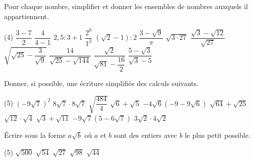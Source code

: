 \documentclass[a4paper,12pt]{report}
\begin{document}
\begin{exo}
Pour chaque nombre, simplifier et donner les ensembles de nombres auxquels il appartiennent.
\begin{tasks}(4)
\task $\dfrac{3-7}{2}$
\task $\dfrac{4}{4-1}$
\task $2,5: 3+1$
\task $\dfrac{2^0}{1^2}$
\task $(\sqrt{2}-1): 2$
\task $\dfrac{3-\sqrt{9}}{\pi}$
\task $\sqrt{3 \cdot 27}$
\task $\dfrac{\sqrt{3}-\sqrt{12}}{\sqrt{27}}$
\task $\sqrt{\sqrt{25}-\dfrac{3}{\sqrt{9}}}$
\task $\dfrac{14}{\sqrt{25}-\sqrt{144}}$
\task $\dfrac{\sqrt{2}}{\sqrt{81}-\dfrac{16}{2}}$
\task $\dfrac{5-\sqrt{3}}{\sqrt{3}-5}$
\end{tasks}
\end{exo} 



\begin{auto}Donner, si possible, une écriture simplifiée des calculs suivants.

\begin{tasks}(5)
	\task $\left(-9 \sqrt{7}\right)^{2}$
	\task $8 \sqrt{7}\cdot 8\sqrt{7}$
	\task $ \sqrt{\dfrac{484}{4}}$
	\task $\sqrt{6}+\sqrt{5}$
	\task $ -4 \sqrt{6}\left( -9  -9\sqrt{6}\right)$
	\task $  \sqrt{64}+\sqrt{25}$
	\task $ \sqrt{12}\cdot \sqrt{4}$
	\task $\sqrt{3}+\sqrt{11}$
	\task $ -9 \sqrt{7}\left( 5  -6\sqrt{7}\right)$
	\task $3 \sqrt{2}\cdot 4\sqrt{2}$
\end{tasks}

\end{auto}

\begin{auto}
Écrire sous la forme $a\sqrt{b}$ où $a$ et $b$ sont des entiers avec $b$ le plus petit possible.

\begin{tasks}(5)
	\task  $\sqrt{500}$
	\task  $\sqrt{54}$
	\task  $\sqrt{27}$
	\task  $\sqrt{98}$
	\task  $\sqrt{44}$
\end{tasks}
\end{auto}
\end{document}
